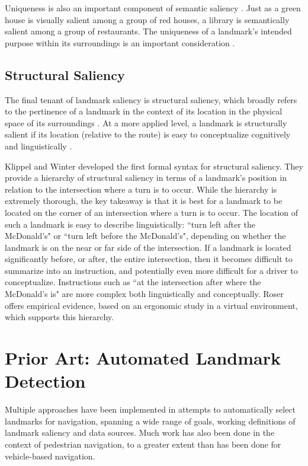 Uniqueness is also an important component of semantic saliency \cite{caduff2008assessment}. Just as a green house is visually salient among a group of red houses, a library is semantically salient among a group of restaurants. The uniqueness of a landmark's intended purpose within its surroundings is an important consideration \cite{caduff2008assessment}.

\subsection{Structural Saliency}
The final tenant of landmark saliency is structural saliency, which broadly refers to the pertinence of a landmark in the context of its location in the physical space of its surroundings \cite{sorrows1999nature}. At a more applied level, a landmark is structurally salient if its location (relative to the route) is easy to conceptualize cognitively and linguistically \cite{klippel2005structural}. 

Klippel and Winter \cite{klippel2005structural} developed the first formal syntax for structural saliency. They provide a hierarchy of structural saliency in terms of a landmark's position in relation to the intersection where a turn is to occur. While the hierarchy is extremely thorough, the key takeaway is that it is best for a landmark to be located on the corner of an intersection where a turn is to occur. The location of such a landmark is easy to describe linguistically: ``turn left after the McDonald's" or ``turn left before the McDonald's", depending on whether the landmark is on the near or far side of the intersection. If a landmark is located significantly before, or after, the entire intersection, then it becomes difficult to summarize into an instruction, and potentially even more difficult for a driver to conceptualize. Instructions such as ``at the intersection after where the McDonald's is" are more complex both linguistically and conceptually. Roser \cite{roser2012structural} offers empirical evidence, based on an ergonomic study in a virtual environment, which supports this hierarchy.

\section{Prior Art: Automated Landmark Detection}\label{Sect:eqns}
Multiple approaches have been implemented in attempts to automatically select landmarks for navigation, spanning a wide range of goals, working definitions of landmark saliency and data sources. Much work has also been done in the context of pedestrian navigation, to a greater extent than has been done for vehicle-based navigation.

